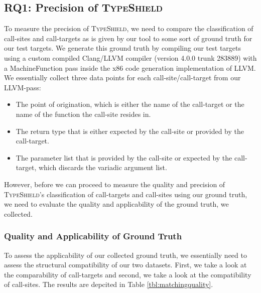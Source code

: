 \subsection{RQ1: Precision of \textsc{TypeShield}}
\label{section:typeshieldprecision}

To measure the precision of \textsc{TypeShield}, we need to compare the classification of call-sites and call-targets as is given by our tool to
some sort of ground truth for our test targets. We generate this ground truth by compiling our test targets using a custom compiled Clang/LLVM
compiler (version 4.0.0 trunk 283889) with a MachineFunction pass inside the x86 code generation implementation of LLVM. We essentially 
collect three data points for each call-site/call-target from our LLVM-pass:
\begin{itemize}
\item The point of origination, which is either the name of the call-target or the name of the function the call-site resides in.
\item The return type that is either expected by the call-site or provided by the call-target.
\item The parameter list that is provided by the call-site or expected by the call-target, which discards the variadic argument list.
\end{itemize}
However, before we can proceed to measure the quality and precision of \textsc{TypeShield}'s classification of call-targets and call-sites
using our ground truth, we need to evaluate the quality and applicability of the ground truth, we collected.

\subsubsection{Quality and Applicability of Ground Truth}
\label{subsection:typeshieldprecision}
To assess the applicability of our collected ground truth, we essentially need to assess the structural compatibility of our two datasets.
First, we take a look at the comparability of call-targets and second, we take a look at the compatibility of call-sites. The results are depcited in Table \ref{tbl:matchingquality}.

